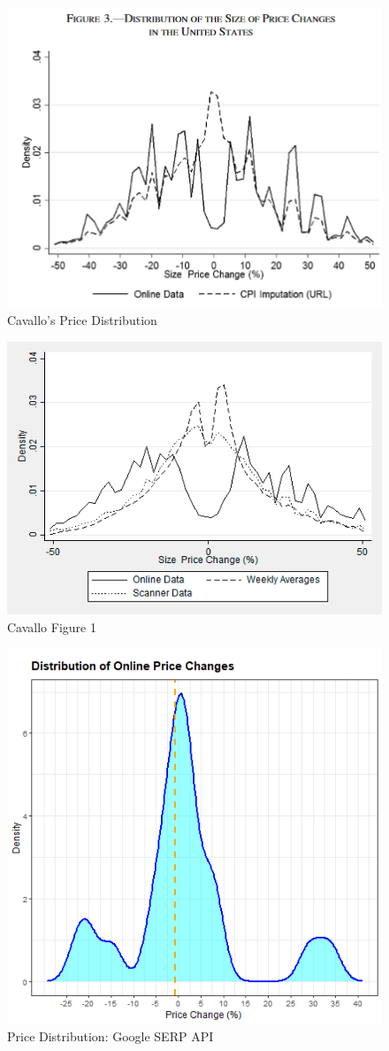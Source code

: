 \newpage
\begin{figure}
\centering
\includegraphics[width=.7\textwidth]{cavallo.png}
\caption{Cavallo's Price Distribution}
\label{fig:Cavallo_dist}
\end{figure}

\newpage
\begin{figure}
\centering
\includegraphics[width=.7\textwidth]{CavalloFig1.png}
\caption{Cavallo Figure 1}
\label{fig:CavalloFig_1}
\end{figure}

\newpage
\begin{figure}
\centering
\includegraphics[width=.7\textwidth]{price_dist.png}
\caption{Price Distribution: Google SERP API}
\label{fig:price_dist}
\end{figure}

